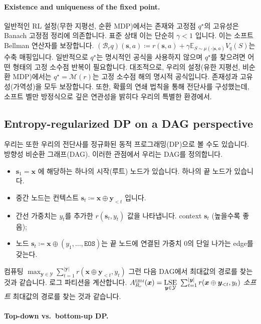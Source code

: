 \documentclass{article}
\def\s{{\bm{s}}}
\def\x{{\bm{x}}}
\def\y{{\bm{y}}}
\def\EE{{\mathbb{E}}}
\def\cM{{\mathcal{M}}}
\def\cY{{\mathcal{Y}}}
\newcommand{\Rsub}[1]{R_{#1}}
\def\ebm{{\textsc{ebm}}}
\def\lse{{\mathrm{LSE}}}
\def\eos{\texttt{EOS}\xspace}
\begin{document}
\paragraph{Existence and uniqueness of the fixed point.}

일반적인 RL 설정(무한 지평선, 순환 MDP)에서는 존재와
고정점 $q^\star$의 고유성은 Banach 고정점 정리에 의존합니다.
표준 상태 
이는 단순히 $\gamma < 1$ 입니다. 이는 소프트 Bellman 연산자를 보장합니다.
 $(\mathcal{B}_r q)(\s, a) \coloneqq r(\s, a) + \gamma \EE_{S \sim \mu(\cdot |
\s, a)} V_{q}(S)$는 수축 매핑입니다.
일반적으로 $q^\star$는 명시적인 공식을 사용하지 않으며
$q^\star$를 찾으려면 어떤 형태의 고정 소수점 반복이 필요합니다.
대조적으로, 우리의 설정(유한 지평선, 비순환 MDP)에서는 
 $q^\star = \cM(r)$는 고정 소수점 해의 명시적 공식입니다.
존재성과 고유성(가역성)을 모두 보장합니다.
또한, 확률의 연쇄 법칙을 통해 전단사를 구성했는데,
소프트 벨만 방정식으로 깊은 연관성을 밝히다
우리의 특별한 환경에서.

\subsection{Entropy-regularized DP on a DAG perspective} 
 \label{sec:dp_dag}

우리는 또한 우리의 전단사를 정규화된 동적 프로그래밍(DP)으로 볼 수도 있습니다.
방향성 비순환 그래프(DAG).  이러한 관점에서 우리는 DAG를 정의합니다.
 \begin{itemize} [topsep=0pt,itemsep=3pt,parsep=3pt,leftmargin=16pt]
 \item $\s_1 = \x$ 에 해당하는 하나의 시작(루트) 노드가 있습니다.
  하나의 끝 노드가 있습니다.
 \item 중간 노드는 컨텍스트 $\s_t \coloneqq \x \oplus \y_{<t}$ 입니다.
 \item 간선 가중치는 $y_t$를 추가한 $r(\s_t, y_t)$ 값을 나타냅니다.
    context $\s_t$ (높을수록 좋음);
 \item 노드 $\s_t \coloneqq \x \oplus (y_1, \dots, \eos)$는
    끝 노드에 연결된 가중치 $0$의 단일 나가는 edge를 갖는다.
 \end{itemize}  
컴퓨팅
 $\max_{\y \in \cY} \sum_{t=1}^{|\y|} r(\x \oplus \y_{<t}, y_t)$  
그런 다음 DAG에서 최대값의 경로를 찾는 것과 같습니다.
로그 파티션을 계산합니다.
 $A^\ebm_{\Rsub{r}}(\x) 
= \underset{\y \in \cY}{\lse} ~ \sum_{t=1}^{|\y|} r(\x \oplus \y_{<t}, y_t)$ 
{ \em 소프트} 최대값의 경로를 찾는 것과 같습니다.

\paragraph{Top-down vs.\ bottom-up DP.}
\end{document}
